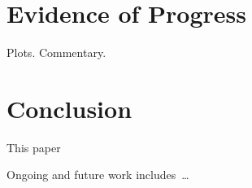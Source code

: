 \documentclass[runningheads]{llncs}
\begin{document}
\section{Evidence of Progress}
\label{Evidence}

Plots.
Commentary.

\section{Conclusion}
\label{Conclusion}

This paper 

Ongoing and future work includes~\ldots



\end{document}
